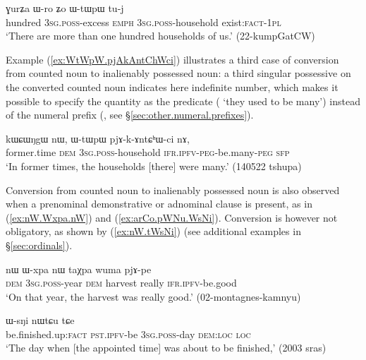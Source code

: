 \begin{exe}
\ex \label{ex:GurZa.Wro.WtWpW}
\gll ɣurʑa ɯ-ro ʑo ɯ-tɯpɯ tu-j \\
 hundred \textsc{3sg}.\textsc{poss}-excess \textsc{emph} \textsc{3sg}.\textsc{poss}-household exist:\textsc{fact}-\textsc{1pl} \\
\glt `There are more than one hundred households of us.' (22-kumpGatCW)
\end{exe}

Example (\ref{ex:WtWpW.pjAkAntChWci}) illustrates a third case of conversion from counted noun to inalienably possessed noun: a third singular possessive on the converted counted noun indicates here indefinite number, which makes it possible to specify the quantity as the predicate ( `they used to be many') instead of the numeral prefix (, see §\ref{sec:other.numeral.prefixes}).

\begin{exe}
\ex \label{ex:WtWpW.pjAkAntChWci}
\gll kɯɕɯŋgɯ nɯ, ɯ-tɯpɯ pjɤ-k-ɤntɕʰɯ-ci nɤ, \\
 former.time \textsc{dem} \textsc{3sg}.\textsc{poss}-household \textsc{ifr}.\textsc{ipfv}-\textsc{peg}-be.many-\textsc{peg} \textsc{sfp} \\
\glt `In former times, the households [there] were many.' (140522 tshupa)
\end{exe}

Conversion from counted noun to inalienably possessed noun is also observed when a prenominal demonstrative or adnominal clause is present, as in (\ref{ex:nW.Wxpa.nW}) and (\ref{ex:arCo.pWNu.WsNi}). Conversion is however not obligatory, as shown by (\ref{ex:nW.tWsNi}) (see additional examples in §\ref{sec:ordinals}).

\begin{exe}
\ex \label{ex:nW.Wxpa.nW}
\gll nɯ ɯ-xpa nɯ taχpa wuma pjɤ-pe \\
\textsc{dem} \textsc{3sg}.\textsc{poss}-year \textsc{dem} harvest really \textsc{ifr}.\textsc{ipfv}-be.good \\
\glt `On that year, the harvest was really good.' (02-montagnes-kamnyu)
\end{exe}

\begin{exe}
\ex \label{ex:arCo.pWNu.WsNi}
\gll [arɕo pɯ-ŋu] ɯ-sŋi nɯtɕu tɕe \\
be.finished.up:\textsc{fact} \textsc{pst}.\textsc{ipfv}-be \textsc{3sg}.\textsc{poss}-day \textsc{dem}:\textsc{loc} \textsc{loc} \\
\glt `The day when [the appointed time] was about to be finished,' (2003 sras)
 \end{exe}
 
